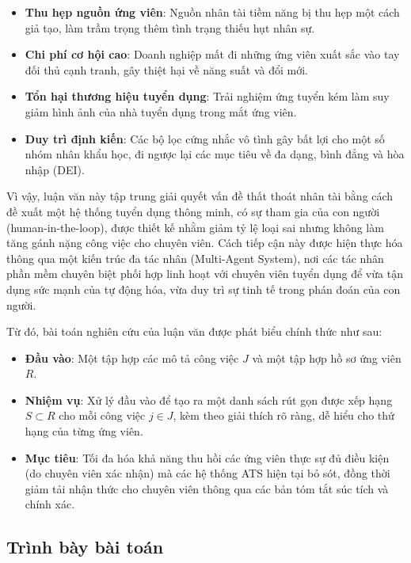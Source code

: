 \documentclass{article}
\begin{document}
\begin{itemize}[topsep=0pt, itemsep=0pt, leftmargin=40pt]
    \item \textbf{Thu hẹp nguồn ứng viên}: Nguồn nhân tài tiềm năng bị thu hẹp một cách giả tạo, làm trầm trọng thêm tình trạng thiếu hụt nhân sự.
    \item \textbf{Chi phí cơ hội cao}: Doanh nghiệp mất đi những ứng viên xuất sắc vào tay đối thủ cạnh tranh, gây thiệt hại về năng suất và đổi mới.
    \item \textbf{Tổn hại thương hiệu tuyển dụng}: Trải nghiệm ứng tuyển kém làm suy giảm hình ảnh của nhà tuyển dụng trong mắt ứng viên.
    \item \textbf{Duy trì định kiến}: Các bộ lọc cứng nhắc vô tình gây bất lợi cho một số nhóm nhân khẩu học, đi ngược lại các mục tiêu về đa dạng, bình đẳng và hòa nhập (DEI).
\end{itemize}

Vì vậy, luận văn này tập trung giải quyết vấn đề thất thoát nhân tài bằng cách đề xuất một hệ thống tuyển dụng thông minh, có sự tham gia của con người (human-in-the-loop), được thiết kế nhằm giảm tỷ lệ loại sai nhưng không làm tăng gánh nặng công việc cho chuyên viên. Cách tiếp cận này được hiện thực hóa thông qua một kiến trúc đa tác nhân (Multi-Agent System), nơi các tác nhân phần mềm chuyên biệt phối hợp linh hoạt với chuyên viên tuyển dụng để vừa tận dụng sức mạnh của tự động hóa, vừa duy trì sự tinh tế trong phán đoán của con người.

Từ đó, bài toán nghiên cứu của luận văn được phát biểu chính thức như sau:

\begin{itemize}[topsep=0pt, itemsep=0pt, leftmargin=40pt]
    \item \textbf{Đầu vào}: Một tập hợp các mô tả công việc $J$ và một tập hợp hồ sơ ứng viên $R$.
    \item \textbf{Nhiệm vụ}: Xử lý đầu vào để tạo ra một danh sách rút gọn được xếp hạng $S\subset R$ cho mỗi công việc $j\in J$, kèm theo giải thích rõ ràng, dễ hiểu cho thứ hạng của từng ứng viên.
    \item \textbf{Mục tiêu}: Tối đa hóa khả năng thu hồi các ứng viên thực sự đủ điều kiện (do chuyên viên xác nhận) mà các hệ thống ATS hiện tại bỏ sót, đồng thời giảm tải nhận thức cho chuyên viên thông qua các bản tóm tắt súc tích và chính xác.
\end{itemize}

\subsection{Trình bày bài toán}
\end{document}
